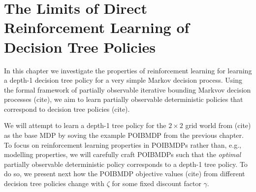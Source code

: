 \chapter{The Limits of Direct Reinforcement Learning of Decision Tree Policies}
In this chapter we investigate the properties of reinforcement learning for learning a depth-1 decision tree policy for a very simple Markov decision process.
Using the formal framework of partially observable iterative bounding Markvov decision processes (cite), we aim to learn partially observable deterministic policies that correspond to decision tree policies (cite).

We will attempt to learn a depth-1 tree policy for the $2\times 2$ grid world from (cite) as the base MDP by soving the example POIBMDP from the previous chapter.
To focus on reinforcement learning properties in POIBMDPs rather than, e.g., modelling properties, we will carefully craft POIBMDPs such that the \textit{optimal} partially observable deterministic policy corresponds to a depth-1 tree policy.
To do so, we present next how the POIBMDP objective values (cite) from different decision tree policies change with $\zeta$ for some fixed discount factor $\gamma$.  

